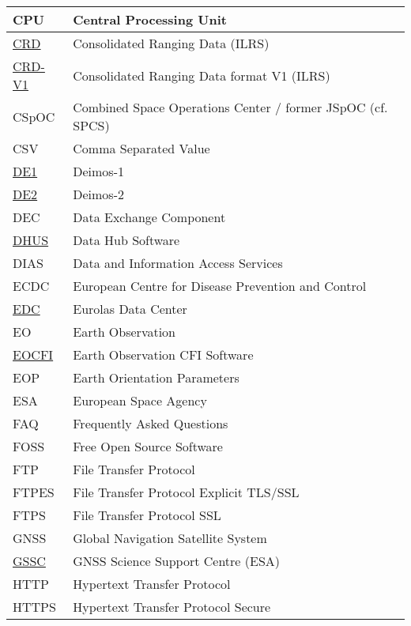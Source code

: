 \documentclass[dec_sum_main.tex]{subfiles}
\begin{document}
\begin{longtable}{|m{2.8cm}|m{10cm}|}
	CPU & Central Processing Unit \\ \hline
	\href{https://ilrs.gsfc.nasa.gov/data_and_products/formats/crd.html}{CRD} & Consolidated Ranging Data (ILRS) \\ \hline
	\href{https://ilrs.gsfc.nasa.gov/docs/2009/crd_v1.01.pdf}{CRD-V1} & Consolidated Ranging Data format V1 (ILRS) \\ \hline
	CSpOC & Combined Space Operations Center /  former JSpOC (cf. SPCS) \\ \hline
    CSV & Comma Separated Value \\ \hline
    \href{https://directory.eoportal.org/web/eoportal/satellite-missions/d/deimos-1}{DE1} & Deimos-1 \\ \hline	
    \href{https://directory.eoportal.org/web/eoportal/satellite-missions/d/deimos-2}{DE2} & Deimos-2 \\ \hline
	DEC & Data Exchange Component \\ \hline
	\href{https://sentineldatahub.github.io/DataHubSystem/}{DHUS} & Data Hub Software \\ \hline
	DIAS & Data and Information Access Services \\ \hline
	ECDC & European Centre for Disease Prevention and Control \\ \hline
	\href{https://edc.dgfi.tum.de/en/}{EDC} & Eurolas Data Center \\ \hline
	EO & Earth Observation \\ \hline
	\href{https://eop-cfi.esa.int/index.php/mission-cfi-software/eocfi-software}{EOCFI} & Earth Observation CFI Software \\ \hline
	EOP & Earth Orientation Parameters \\ \hline
	ESA & European Space Agency \\ \hline
	FAQ & Frequently Asked Questions \\ \hline
	FOSS & Free Open Source Software \\ \hline
	FTP & File Transfer Protocol \\ \hline
	FTPES & File Transfer Protocol Explicit TLS/SSL \\ \hline
	FTPS & File Transfer Protocol SSL \\ \hline
	GNSS & Global Navigation Satellite System \\ \hline
	\href{https://gssc.esa.int/#about-us}{GSSC} & GNSS Science Support Centre (ESA) \\ \hline
	HTTP & Hypertext Transfer Protocol \\ \hline
	HTTPS & Hypertext Transfer Protocol Secure\\ \hline

\end{longtable}
\end{document}
